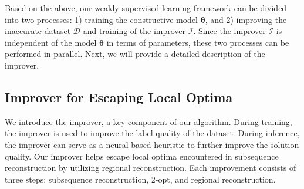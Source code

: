 Based on the above, our weakly supervised learning framework can be divided into two processes: 1) training the constructive model $\boldsymbol{\theta}$, and 2) improving the inaccurate dataset $\mathcal{D}$ and training of the improver $\mathcal{I}$. 
Since the improver $\mathcal{I}$ is independent of the model $\boldsymbol{\theta}$ in terms of parameters, these two processes can be performed in parallel. Next, we will provide a detailed description of the improver.

\subsection{Improver for Escaping Local Optima}
We introduce the improver, a key component of our algorithm. 
During training, the improver is used to improve the label quality of the dataset. During inference, the improver can serve as a neural-based heuristic to further improve the solution quality. 
Our improver helps escape local optima encountered in subsequence reconstruction by utilizing regional reconstruction.
Each improvement consists of three steps: subsequence reconstruction, 2-opt, and regional reconstruction.

